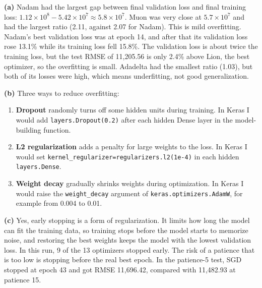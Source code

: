 \documentclass[12pt,a4paper]{article}
\begin{document}
\begin{answerbox}
\textbf{(a)} Nadam had the largest gap between final validation loss and final training loss: \(1.12\times10^8-5.42\times10^7\approx5.8\times10^7\). Muon was very close at \(5.7\times10^7\) and had the largest ratio (2.11, against 2.07 for Nadam). This is mild overfitting. Nadam's best validation loss was at epoch 14, and after that its validation loss rose 13.1\% while its training loss fell 15.8\%. The validation loss is about twice the training loss, but the test RMSE of 11,205.56 is only 2.4\% above Lion, the best optimizer, so the overfitting is small. Adadelta had the smallest ratio (1.03), but both of its losses were high, which means underfitting, not good generalization.

\textbf{(b)} Three ways to reduce overfitting:
\begin{enumerate}
\item \textbf{Dropout} randomly turns off some hidden units during training. In Keras I would add \texttt{layers.Dropout(0.2)} after each hidden Dense layer in the model-building function.
\item \textbf{L2 regularization} adds a penalty for large weights to the loss. In Keras I would set \texttt{kernel\_regularizer=regularizers.l2(1e-4)} in each hidden \texttt{layers.Dense}.
\item \textbf{Weight decay} gradually shrinks weights during optimization. In Keras I would raise the \texttt{weight\_decay} argument of \texttt{keras.optimizers.AdamW}, for example from 0.004 to 0.01.
\end{enumerate}

\textbf{(c)} Yes, early stopping is a form of regularization. It limits how long the model can fit the training data, so training stops before the model starts to memorize noise, and restoring the best weights keeps the model with the lowest validation loss. In this run, 9 of the 13 optimizers stopped early. The risk of a patience that is too low is stopping before the real best epoch. In the patience-5 test, SGD stopped at epoch 43 and got RMSE 11,696.42, compared with 11,482.93 at patience 15.
\end{answerbox}
\end{document}
